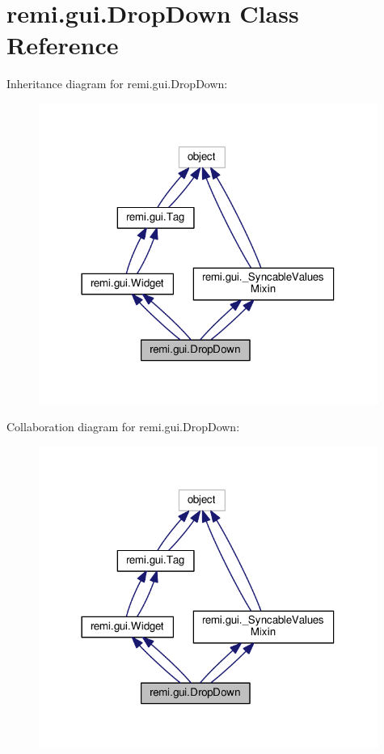 \hypertarget{classremi_1_1gui_1_1DropDown}{}\section{remi.\+gui.\+Drop\+Down Class Reference}
\label{classremi_1_1gui_1_1DropDown}


Inheritance diagram for remi.\+gui.\+Drop\+Down\+:
\nopagebreak
\begin{figure}[H]
\begin{center}
\leavevmode
\includegraphics[width=314pt]{d1/dbd/classremi_1_1gui_1_1DropDown__inherit__graph}
\end{center}
\end{figure}


Collaboration diagram for remi.\+gui.\+Drop\+Down\+:
\nopagebreak
\begin{figure}[H]
\begin{center}
\leavevmode
\includegraphics[width=314pt]{d2/d3d/classremi_1_1gui_1_1DropDown__coll__graph}
\end{center}
\end{figure}

